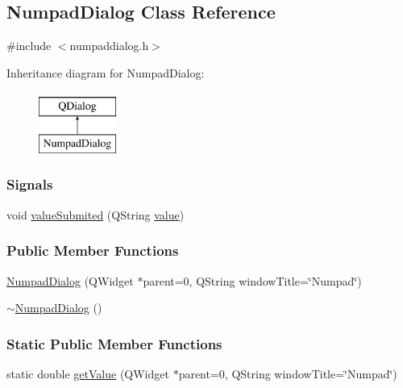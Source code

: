 \hypertarget{classNumpadDialog}{}\subsection{Numpad\+Dialog Class Reference}
\label{classNumpadDialog}


{\ttfamily \#include $<$numpaddialog.\+h$>$}

Inheritance diagram for Numpad\+Dialog\+:\begin{figure}[H]
\begin{center}
\leavevmode
\includegraphics[height=2.000000cm]{classNumpadDialog}
\end{center}
\end{figure}
\subsubsection*{Signals}
\begin{DoxyCompactItemize}
\item 
void \mbox{\hyperlink{classNumpadDialog_ada306195f37d11153dba09bbfa35ac84}{value\+Submited}} (Q\+String \mbox{\hyperlink{classNumpadDialog_ad5046b269957f80f82d36b7ab800fc5d}{value}})
\end{DoxyCompactItemize}
\subsubsection*{Public Member Functions}
\begin{DoxyCompactItemize}
\item 
\mbox{\hyperlink{classNumpadDialog_aa6757d0d987f0be6acffbc4b64551252}{Numpad\+Dialog}} (Q\+Widget $\ast$parent=0, Q\+String window\+Title=\char`\"{}Numpad\char`\"{})
\item 
\mbox{\hyperlink{classNumpadDialog_a1aaf28df454bd5bbf2ab3829df0fcd8f}{$\sim$\+Numpad\+Dialog}} ()
\end{DoxyCompactItemize}
\subsubsection*{Static Public Member Functions}
\begin{DoxyCompactItemize}
\item 
static double \mbox{\hyperlink{classNumpadDialog_a0da4d8e9b7a4c80663421109e6bb68d0}{get\+Value}} (Q\+Widget $\ast$parent=0, Q\+String window\+Title=\char`\"{}Numpad\char`\"{})
\end{DoxyCompactItemize}
